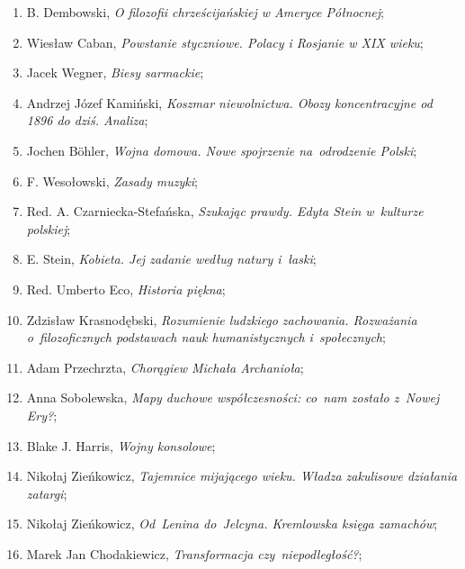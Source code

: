 \documentclass[a4paper,11pt]{article}
\begin{document}
\begin{enumerate}
\item B. Dembowski, \textit{O filozofii chrześcijańskiej w Ameryce
    Północnej};

\item Wiesław Caban, \textit{Powstanie styczniowe. Polacy i Rosjanie w
    XIX wieku};

\item Jacek Wegner, \textit{Biesy sarmackie};

\item Andrzej Józef Kamiński, \textit{Koszmar niewolnictwa. Obozy
    koncentracyjne od 1896 do dziś. Analiza};

\item Jochen B\"{o}hler, \textit{Wojna domowa. Nowe spojrzenie
    na~odrodzenie Polski};

\item F. Wesołowski, \textit{Zasady muzyki};

\item Red. A. Czarniecka-Stefańska, \textit{Szukając prawdy. Edyta Stein
    w~kulturze polskiej};

\item E. Stein, \textit{Kobieta. Jej zadanie według natury i~łaski};

\item Red. Umberto Eco, \textit{Historia piękna};

\item Zdzisław Krasnodębski, \textit{Rozumienie ludzkiego zachowania.
    Rozważania o~filozoficznych podstawach nauk humanistycznych
    i~społecznych};

\item Adam Przechrzta, \textit{Chorągiew Michała Archanioła};

\item Anna Sobolewska, \textit{Mapy duchowe współczesności: co~nam
    zostało z~Nowej Ery?};

\item Blake J. Harris, \textit{Wojny konsolowe};

\item Nikołaj Zieńkowicz, \textit{Tajemnice mijającego wieku. Władza
    zakulisowe działania zatargi};

\item Nikołaj Zieńkowicz, \textit{Od~Lenina do~Jelcyna. Kremlowska
    księga zamachów};

\item Marek Jan Chodakiewicz, \textit{Transformacja czy~niepodległość?};


\end{enumerate}
\end{document}
